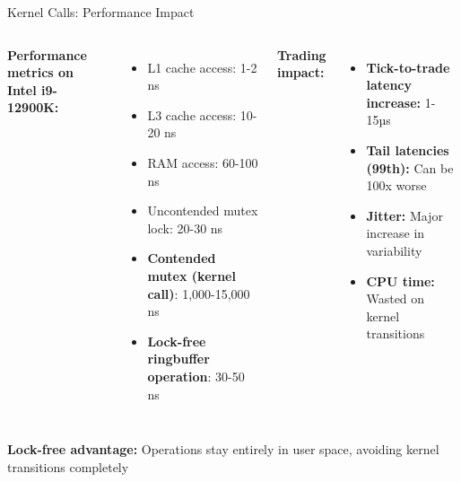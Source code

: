 \documentclass{beamer}
\begin{document}
\begin{frame}{Kernel Calls: Performance Impact}

\begin{columns}
\textbf{Performance metrics on Intel i9-12900K:}
\begin{itemize}
    \item L1 cache access: 1-2 ns
    \item L3 cache access: 10-20 ns
    \item RAM access: 60-100 ns
    \item Uncontended mutex lock: 20-30 ns
    \item \textbf{Contended mutex (kernel call)}: 1,000-15,000 ns
    \item \textbf{Lock-free ringbuffer operation}: 30-50 ns
\end{itemize}

\textbf{Trading impact:}
\begin{itemize}
    \item \textbf{Tick-to-trade latency increase:} 1-15µs
    \item \textbf{Tail latencies (99th):} Can be 100x worse
    \item \textbf{Jitter:} Major increase in variability
    \item \textbf{CPU time:} Wasted on kernel transitions
\end{itemize}

\end{columns}

\textbf{Lock-free advantage:} Operations stay entirely in user space, avoiding kernel transitions completely
\end{frame}
\end{document}

